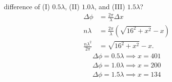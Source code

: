 \documentclass{article}
\begin{document}
\begin{enumerate}
\begin{enumerate}
\begin{enumerate}
\begin{enumerate}
                difference of (I) $0.5\lambda$, (II) $1.0\lambda$, and (III) $1.5\lambda$?
                \begin{align}
                  \Delta \phi &= \frac{2\pi}{\lambda}\Delta x \\
                  n\lambda &= \frac{2\pi}{\lambda}\left( \sqrt{16^2+x^2} -x \right) \\
                  \frac{n\lambda^2}{2\pi} &= \sqrt{16^2+x^2} -x
                .\end{align}
                \begin{gather}
                  \Delta\phi=0.5\lambda \implies x=401\\
                  \Delta\phi=1.0\lambda \implies x=200\\
                  \Delta\phi=1.5\lambda \implies x=134\\
                \end{gather}
            \end{enumerate}
        \end{enumerate}
    \end{enumerate}


\end{enumerate}
\end{document}
